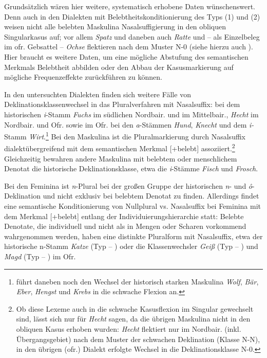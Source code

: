 Grundsätzlich wären hier weitere, systematisch erhobene Daten wünschenswert. Denn auch in den Dialekten mit Belebtheitskonditionierung des Typs (1) und (2) weisen nicht alle belebten Maskulina Nasalsuffigierung in den obliquen Singularkasus auf; vor allem \textit{Spatz} und daneben auch \textit{Ratte} und -- als Einzelbeleg im ofr. Gebsattel -- \textit{Ochse} flektieren nach dem Muster N-0 (siehe hierzu auch ). Hier braucht es weitere Daten, um eine mögliche Abstufung des semantischen Merkmals Belebtheit abbilden oder den Abbau der Kasusmarkierung auf mögliche Frequenzeffekte zurückführen zu können.

In den untersuchten Dialekten finden sich weitere Fälle von Deklinationsklassenwechsel in das Pluralverfahren mit Nasalsuffix: bei dem historischen \textit{i}{}-Stamm \textit{Fuchs} im südlichen Nordbair. und im Mittelbair., \textit{Hecht} im Nordbair. und Ofr. sowie im Ofr. bei den \textit{a}{}-Stämmen \textit{Hund}, \textit{Knecht} und dem \textit{i-}Stamm \textit{Wirt}.\footnote{\citet[§20--21]{Micko-Repp1933} führt daneben noch den Wechsel der historisch starken Maskulina \textit{Wolf}, \textit{Bär}, \textit{Eber}, \textit{Hengst} und \textit{Krebs} in die schwache Flexion an.} Bei den Maskulina ist die Pluralmarkierung durch Nasalsuffix dialektübergreifend mit dem semantischen Merkmal [+belebt] assoziiert.\footnote{Ob diese Lexeme auch in die schwache Kasusflexion im Singular gewechselt sind, lässt sich nur für \textit{Hecht} sagen, da die übrigen Maskulina nicht in den obliquen Kasus erhoben wurden: \textit{Hecht} flektiert nur im Nordbair. (inkl. Übergangsgebiet) nach dem Muster der schwachen Deklination (Klasse N-N), in den übrigen (ofr.) Dialekt erfolgte Wechsel in die Deklinationsklasse N-0.} Gleichzeitig bewahren andere Maskulina mit belebtem oder menschlichem Denotat die historische Deklinationsklasse, etwa die \textit{i}{}-Stämme \textit{Fisch} und \textit{Frosch}.

Bei den Feminina ist \textit{n}{}-Plural bei der großen Gruppe der historischen \textit{n}{}- und \textit{ô}{}-Deklination und nicht exklusiv bei belebtem Denotat zu finden. Allerdings findet eine semantische Konditionierung von Nullplural vs. Nasalsuffix bei Feminina mit dem Merkmal [+belebt] entlang der Individuierungshierarchie statt: Belebte Denotate, die individuell und nicht als in Mengen oder Scharen vorkommend wahrgenommen werden, haben eine distinkte Pluralform mit Nasalsuffix, etwa der historische n-Stamm \textit{Katze} (Typ  -- ) oder die Klassenwechsler \textit{Geiß} (Typ  -- ) und \textit{Magd} (Typ  -- ) im Ofr.

